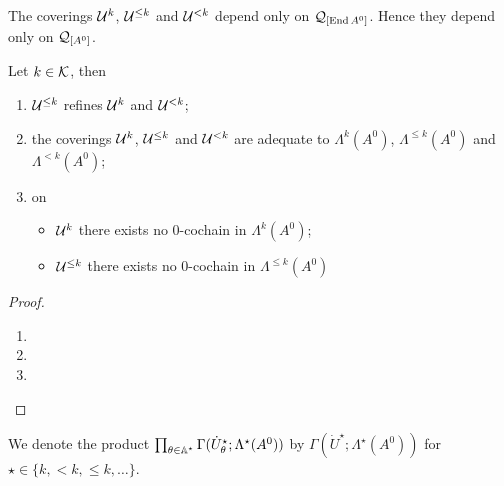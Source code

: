 \begin{rem}
  The coverings $\mathcal{U}^{k}$, $\mathcal{U}^{\leq k}$ and $\mathcal{U}^{<k}$ depend only on
  $\mathcal{Q}_{[\operatorname{End} A^0]}$. Hence they depend only on $\mathcal{Q}_{[A^0]}$.
\end{rem}
\begin{prop}
  Let $k\in\mathcal{K}$, then
  \begin{enumerate}
    \item $\mathcal{U}^{\leq k}$ refines $\mathcal{U}^{k}$ and $\mathcal{U}^{<k}$;
    \item the coverings $\mathcal{U}^{k}$, $\mathcal{U}^{\leq k}$ and $\mathcal{U}^{<k}$ are adequate
      to $\Lambda^k(A^0)$, $\Lambda^{\leq k}(A^0)$ and $\Lambda^{<k}(A^0)$;
    \item on
      \begin{itemize}
        \item $\mathcal{U}^k$ there exists no $0$-cochain in $\Lambda^k(A^0)$;
        \item $\mathcal{U}^{\leq k}$ there exists no $0$-cochain in
          $\Lambda^{\leq k}(A^0)$
      \end{itemize}
  \end{enumerate}
\end{prop}
\begin{proof}
  \begin{enumerate}
    \item \TODO{}
    \item \TODO{}
    \item \TODO{}
  \end{enumerate}
\end{proof}
We denote the product
$\prod_{\theta\in\mathbb{A}^\star}\Gamma(\dot U_\theta^\star;\Lambda^\star(A^0))$ by
$\Gamma(\dot U^\star;\Lambda^\star(A^0))$ for $\star\in\{k,<k,\leq k,\dots\}$.


